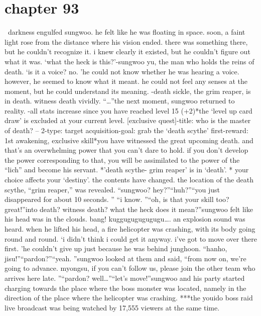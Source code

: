 \section{chapter 93}






 darkness engulfed sungwoo.
 he felt like he was floating in space.
 soon, a faint light rose from the distance where his vision ended.
there was something there, but he couldn’t recognize it.
 i knew clearly it existed, but he couldn’t figure out what it was.
‘what the heck is this?’-sungwoo yu, the man who holds the reins of death.
‘is it a voice? no.
’he could not know whether he was hearing a voice.
 however, he seemed to know what it meant.
 he could not feel any senses at the moment, but he could understand its meaning.
-death sickle, the grim reaper, is in death.
 witness death vividly.
“…”the next moment, sungwoo returned to reality.
-all stats increase since you have reached level 15 (+2)*the ‘level up card draw’ is excluded at your current level.
[exclusive quest]-title: who is the master of death? – 2-type: target acquisition-goal: grab the ‘death scythe’ first-reward: 1st awakening, exclusive skill*you have witnessed the great upcoming death.
 and that’s an overwhelming power that you can’t dare to hold.
 if you don’t develop the power corresponding to that, you will be assimilated to the power of the “lich” and become his servant.
*’death scythe- grim reaper’ is in ‘death’.
* your choice affects your ‘destiny’.
the contents have changed.
 the location of the death scythe, “grim reaper,” was revealed.
“sungwoo? hey?”“huh?”“you just disappeared for about 10 seconds.
”
“i know.
”“oh, is that your skill too? great!”into death? witness death? what the heck does it mean?”sungwoo felt like his head was in the clouds.
bang! kuggugugugugugu….
an explosion sound was heard.
 when he lifted his head, a fire helicopter was crashing, with its body going round and round.
‘i didn’t think i could get it anyway.
 i’ve got to move over there first.
’he couldn’t give up just because he was behind junghoon.
“hanho, jisu!”“pardon?”“yeah.
”sungwoo looked at them and said, “from now on, we’re going to advance.
 myongsu, if you can’t follow us, please join the other team who arrives here late.
”“pardon? well…”“let’s move!”sungwoo and his party started charging towards the place where the boss monster was located, namely in the direction of the place where the helicopter was crashing.
***the youido boss raid live broadcast was being watched by 17,555 viewers at the same time.
